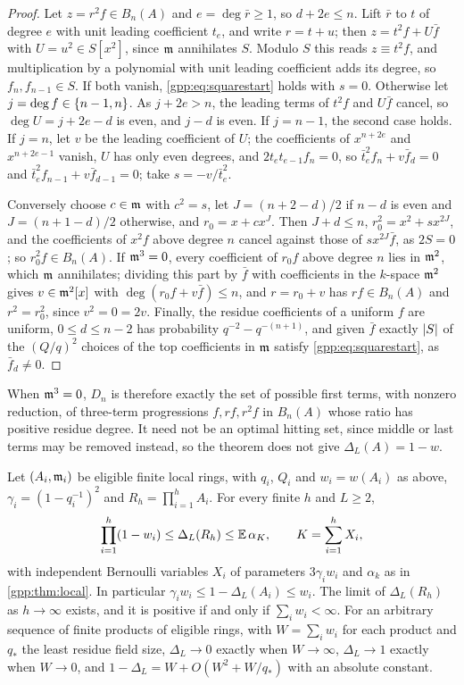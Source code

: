 \begin{proof}
Let $z=r^2f\in B_n(A)$ and $e=\deg\bar r\ge1$, so $d+2e\le n$. Lift $\bar r$ to $t$ of degree
$e$ with unit leading coefficient $t_e$, and write $r=t+u$; then $z=t^2f+U\bar f$ with
$U=u^2\in S[x^2]$, since $\mathfrak{m}$ annihilates $S$. Modulo $S$ this reads
$z\equiv t^2f$, and multiplication by a polynomial with unit leading coefficient adds its
degree, so $f_n,f_{n-1}\in S$. If both vanish, \eqref{gpp:eq:squarestart} holds with
$s=0$. Otherwise let $j=\deg f\in\{n-1,n\}$. As $j+2e>n$, the leading terms of $t^2f$ and
$U\bar f$ cancel, so $\deg U=j+2e-d$ is even, and $j-d$ is even. If $j=n-1$, the second
case holds. If $j=n$, let $v$ be the leading coefficient of $U$; the coefficients of
$x^{n+2e}$ and $x^{n+2e-1}$ vanish, $U$ has only even degrees, and $2t_et_{e-1}f_n=0$, so
$\bar t_e^2f_n+v\bar f_d=0$ and $\bar t_e^2f_{n-1}+v\bar f_{d-1}=0$; take
$s=-v/\bar t_e^2$.

Conversely choose $c\in\mathfrak{m}$ with $c^2=s$, let $J=(n+2-d)/2$ if $n-d$ is even and
$J=(n+1-d)/2$ otherwise, and $r_0=x+cx^J$. Then $J+d\le n$, $r_0^2=x^2+sx^{2J}$, and the
coefficients of $x^2f$ above degree $n$ cancel against those of $sx^{2J}\bar f$, as
$2S=0$; so $r_0^2f\in B_n(A)$. If $\mathfrak{m}^3=0$, every coefficient of $r_0f$ above degree $n$
lies in $\mathfrak{m}^2$, which $\mathfrak{m}$ annihilates; dividing this part by $\bar f$ with
coefficients in the $k$-space $\mathfrak{m}^2$ gives $v\in\mathfrak{m}^2[x]$ with $\deg(r_0f+v\bar f)\le n$,
and $r=r_0+v$ has $rf\in B_n(A)$ and $r^2=r_0^2$, since $v^2=0=2v$. Finally, the residue
coefficients of a uniform $f$ are uniform, $0\le d\le n-2$ has probability
$q^{-2}-q^{-(n+1)}$, and given $\bar f$ exactly $\lvert S\rvert$ of the $(Q/q)^2$ choices of the top
coefficients in $\mathfrak{m}$ satisfy \eqref{gpp:eq:squarestart}, as $\bar f_d\ne0$.
\end{proof}

When $\mathfrak{m}^3=0$, $D_n$ is therefore exactly the set of possible first terms, with nonzero
reduction, of three-term progressions $f,rf,r^2f$ in $B_n(A)$ whose ratio has positive
residue degree. It need not be an optimal hitting set, since middle or last terms may be
removed instead, so the theorem does not give $\Delta_L(A)=1-w$.

\begin{theorem}\label{gpp:thm:cubezero}
Let $(A_i,\mathfrak{m}_i)$ be eligible finite local rings, with $q_i$, $Q_i$ and $w_i=w(A_i)$ as
above, $\gamma_i=(1-q_i^{-1})^2$ and $R_h=\prod_{i=1}^hA_i$. For every finite $h$ and
$L\ge2$,
\[
 \prod_{i=1}^h(1-w_i)\le\Delta_L(R_h)\le\mathbb{E}\,\alpha_K,\qquad K=\sum_{i=1}^hX_i,
\]
with independent Bernoulli variables $X_i$ of parameters $3\gamma_iw_i$ and $\alpha_k$ as in
\cref{gpp:thm:local}. In particular $\gamma_iw_i\le1-\Delta_L(A_i)\le w_i$. The limit of
$\Delta_L(R_h)$ as $h\to\infty$ exists, and it is positive if and only if
$\sum_iw_i<\infty$. For an arbitrary sequence of finite products of eligible rings, with
$W=\sum_iw_i$ for each product and $q_*$ the least residue field size, $\Delta_L\to0$
exactly when $W\to\infty$, $\Delta_L\to1$ exactly when $W\to0$, and
$1-\Delta_L=W+O(W^2+W/q_*)$ with an absolute constant.
\end{theorem}


